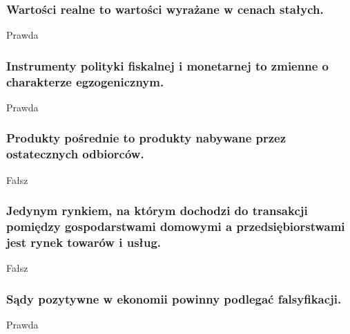 \documentclass[a4paper,12pt]{article}
\begin{document}
\subsubsection{Wartości realne to wartości wyrażane w cenach stałych.}

Prawda

\subsubsection{Instrumenty polityki fiskalnej i monetarnej to zmienne o charakterze egzogenicznym.}

Prawda

\subsubsection{Produkty pośrednie to produkty nabywane przez ostatecznych odbiorców.}

Fałsz

\subsubsection{Jedynym rynkiem, na którym dochodzi do transakcji pomiędzy gospodarstwami domowymi a przedsiębiorstwami jest rynek towarów i usług.}

Fałsz

\subsubsection{Sądy pozytywne w ekonomii powinny podlegać falsyfikacji.}

Prawda
\end{document}
